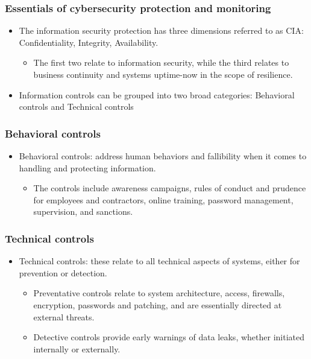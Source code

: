 \subsubsection{Essentials of cybersecurity protection and monitoring }
\begin{itemize}
\item The information security protection has three dimensions referred to as CIA: Confidentiality, Integrity, Availability.
    \begin{itemize}
    \item The first two relate to information security, while the third relates to business continuity and systems uptime-now in the scope of resilience.
    \end{itemize}
\item Information controls can be grouped into two broad categories: Behavioral controls and Technical controls
\end{itemize}


\subsubsection{Behavioral controls}
\begin{itemize}
\item Behavioral controls: address human behaviors and fallibility when it comes to handling and protecting information.
    \begin{itemize}
    \item The controls include awareness campaigns, rules of conduct and prudence for employees and contractors, online training, password management, supervision, and sanctions.
    \end{itemize}
\end{itemize}




\subsubsection{Technical controls}
\begin{itemize}
\item Technical controls: these relate to all technical aspects of systems, either for prevention or detection.
    \begin{itemize}
    \item Preventative controls relate to system architecture, access, firewalls, encryption, passwords and patching, and are essentially directed at external threats.
    \item Detective controls provide early warnings of data leaks, whether initiated internally or externally.
    \end{itemize}
    
\end{itemize}


